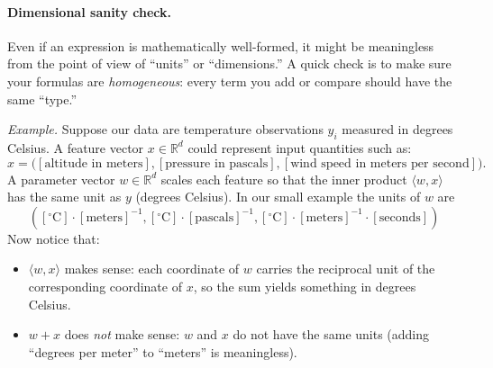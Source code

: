 \paragraph{Dimensional sanity check.}  
Even if an expression is mathematically well-formed, it might be meaningless from the point of view of ``units'' or ``dimensions.''  
A quick check is to make sure your formulas are \emph{homogeneous}: every term you add or compare should have the same ``type.'' 
 
\noindent
\textit{Example.} Suppose our data are temperature observations $y_i$ measured in degrees Celsius. A feature vector $x \in \mathbb{R}^d$ could represent input quantities such as:
\[
x = \big([\text{altitude in meters}], [\text{pressure in pascals}], [\text{wind speed in meters per second}] \big).
\]
A parameter vector $w \in \mathbb{R}^d$ scales each feature so that the inner product $\langle w, x \rangle$
has the same unit as $y$ (degrees Celsius). In our small example the units of $w$ are 
\[ ([^\circ\mathrm{C}] \cdot [\text{meters}]^{-1}, [^\circ\mathrm{C}] \cdot [\text{pascals}]^{-1}, [^\circ\mathrm{C}] \cdot [\text{meters}]^{-1} \cdot [\text{seconds}]) \]
Now notice that:
\begin{itemize}
    \item $\langle w, x \rangle$ makes sense: each coordinate of $w$ carries the reciprocal unit of the corresponding coordinate of $x$, so the sum yields something in degrees Celsius.  
    \item $w + x$ does \emph{not} make sense: $w$ and $x$ do not have the same units (adding ``degrees per meter'' to ``meters'' is meaningless).  
\end{itemize}


